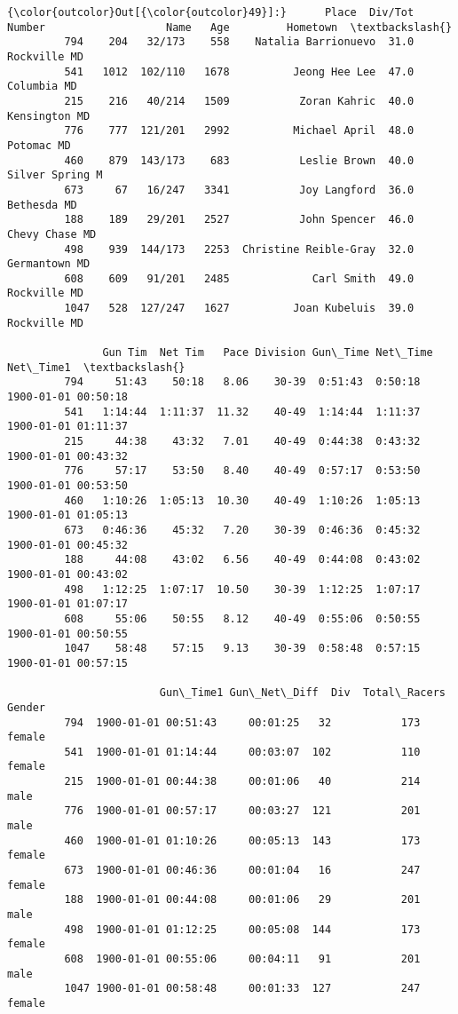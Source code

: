 \documentclass[11pt]{article}
\begin{document}
\begin{Verbatim}[commandchars=\\\{\}]
{\color{outcolor}Out[{\color{outcolor}49}]:}      Place  Div/Tot Number                   Name   Age         Hometown  \textbackslash{}
         794    204   32/173    558    Natalia Barrionuevo  31.0     Rockville MD   
         541   1012  102/110   1678          Jeong Hee Lee  47.0      Columbia MD   
         215    216   40/214   1509           Zoran Kahric  40.0    Kensington MD   
         776    777  121/201   2992          Michael April  48.0       Potomac MD   
         460    879  143/173    683           Leslie Brown  40.0  Silver Spring M   
         673     67   16/247   3341           Joy Langford  36.0      Bethesda MD   
         188    189   29/201   2527           John Spencer  46.0   Chevy Chase MD   
         498    939  144/173   2253  Christine Reible-Gray  32.0    Germantown MD   
         608    609   91/201   2485             Carl Smith  49.0     Rockville MD   
         1047   528  127/247   1627          Joan Kubeluis  39.0     Rockville MD   
         
               Gun Tim  Net Tim   Pace Division Gun\_Time Net\_Time           Net\_Time1  \textbackslash{}
         794     51:43    50:18   8.06    30-39  0:51:43  0:50:18 1900-01-01 00:50:18   
         541   1:14:44  1:11:37  11.32    40-49  1:14:44  1:11:37 1900-01-01 01:11:37   
         215     44:38    43:32   7.01    40-49  0:44:38  0:43:32 1900-01-01 00:43:32   
         776     57:17    53:50   8.40    40-49  0:57:17  0:53:50 1900-01-01 00:53:50   
         460   1:10:26  1:05:13  10.30    40-49  1:10:26  1:05:13 1900-01-01 01:05:13   
         673   0:46:36    45:32   7.20    30-39  0:46:36  0:45:32 1900-01-01 00:45:32   
         188     44:08    43:02   6.56    40-49  0:44:08  0:43:02 1900-01-01 00:43:02   
         498   1:12:25  1:07:17  10.50    30-39  1:12:25  1:07:17 1900-01-01 01:07:17   
         608     55:06    50:55   8.12    40-49  0:55:06  0:50:55 1900-01-01 00:50:55   
         1047    58:48    57:15   9.13    30-39  0:58:48  0:57:15 1900-01-01 00:57:15   
         
                        Gun\_Time1 Gun\_Net\_Diff  Div  Total\_Racers  Gender  
         794  1900-01-01 00:51:43     00:01:25   32           173  female  
         541  1900-01-01 01:14:44     00:03:07  102           110  female  
         215  1900-01-01 00:44:38     00:01:06   40           214    male  
         776  1900-01-01 00:57:17     00:03:27  121           201    male  
         460  1900-01-01 01:10:26     00:05:13  143           173  female  
         673  1900-01-01 00:46:36     00:01:04   16           247  female  
         188  1900-01-01 00:44:08     00:01:06   29           201    male  
         498  1900-01-01 01:12:25     00:05:08  144           173  female  
         608  1900-01-01 00:55:06     00:04:11   91           201    male  
         1047 1900-01-01 00:58:48     00:01:33  127           247  female  
\end{Verbatim}
            
\end{document}
